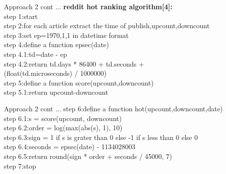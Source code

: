 \documentclass{beamer}
\begin{document}
	\begin{frame}{Approach 2 cont ...}
	\textbf{\Large{reddit hot ranking algorithm[4]:}}\\
	\Large{step 1:start\\
	step 2:for each article extract the time of publish,upcount,downcount\\
	step 3:set ep=1970,1,1 in datetime format\\
	step 4.define a function epsec(date)\\
	\hspace{.3cm}step 4.1:td=date - ep\\
	\hspace{.3cm}step 4.2:return td.days * 86400 + td.seconds +\\ \hspace{.8cm}(float(td.microseconds) / 1000000)\\
	step 5:define a function score(upcount,downcount)\\
	\hspace{.3cm}step 5.1:return upcount-downcount\\}
    \end{frame}
    \begin{frame}{Approach 2 cont ...}
    \Large{step 6:define a function hot(upcount,downcount,date)\\
    \hspace{.3cm}step 6.1:s = score(upcount, downcount)\\
    \hspace{.3cm}step 6.2:order = log(max(abs(s), 1), 10)\\
    \hspace{.3cm}step 6.3:sign = 1 if s is grater than 0 else -1 if s less than 0 else 0\\
    \hspace{.3cm}step 6.4:seconds = epsec(date) - 1134028003\\
    \hspace{.3cm}step 6.5:return round(sign * order + seconds / 45000, 7)\\
    step 7:stop}
    \end{frame}
	
	
	
	       
	
\end{document}
